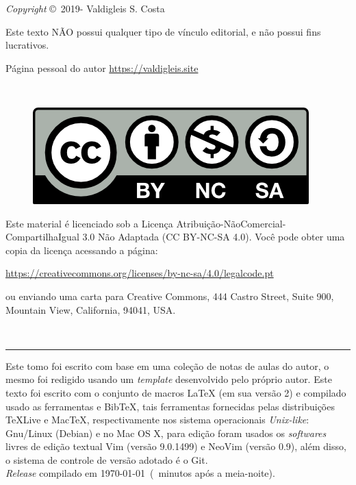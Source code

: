 \begingroup

\newpage
\thispagestyle{empty}





\noindent \textit{Copyright} \copyright\ 2019-{\the\year} Valdigleis S. Costa

\noindent Este texto  \textsc{NÃO}  possui qualquer tipo de vínculo editorial, e não possui fins lucrativos.

\noindent Página pessoal do autor \url{https://valdigleis.site}

~\vfill

\thispagestyle{empty}

\begin{figure}[h]
	\centering
	\includegraphics[width=0.15\linewidth]{fig/license}
\end{figure}
\noindent Este material é licenciado sob a Licença Atribuição-NãoComercial-CompartilhaIgual 3.0 Não Adaptada (CC BY-NC-SA 4.0).  Você pode obter uma copia da licença acessando a página: 
\begin{center}
	\url{https://creativecommons.org/licenses/by-nc-sa/4.0/legalcode.pt}
\end{center}
\noindent ou enviando uma carta para Creative Commons, 444 Castro Street, Suite 900, Mountain View, California, 94041, USA.

~\vfill

\hrule
\vspace*{1cm}

\noindent Este tomo foi escrito com base em uma coleção de notas de aulas do autor, o mesmo foi redigido usando um \textit{template} desenvolvido pelo próprio autor. Este texto foi escrito com o conjunto de macros {\LaTeX} ({\color{NordAurora1}em sua versão 2}) e compilado usado as ferramentas {\LuaLaTeX} e {Bib\TeX}, tais ferramentas fornecidas pelas distribuições {\TeX}Live e Mac{\TeX}, respectivamente  nos sistema operacionais \textit{Unix-like}: Gnu/Linux ({\color{NordAurora1}Debian}) e no Mac OS X, para edição foram usados os \textit{softwares} livres  de edição textual Vim ({\color{NordAurora1}versão 9.0.1499}) e NeoVim ({\color{NordAurora1}versão 0.9}), além disso, o sistema de controle de versão adotado é o Git. \\ 

\noindent \textit{Release} compilado em \today\ (\MinutesAfterMidnight\ minutos após a meia-noite). %

\endgroup
